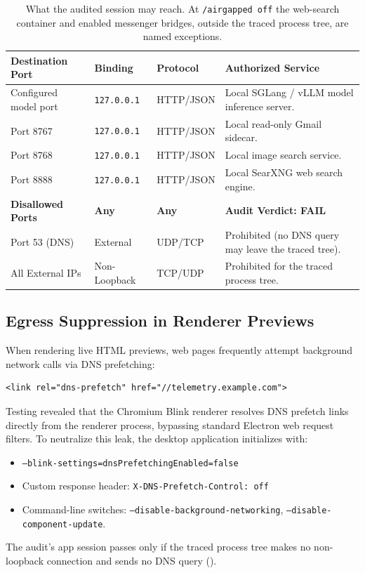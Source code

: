\documentclass[11pt]{article}
\newcommand{\code}[1]{\texttt{#1}}
\newcommand{\agoff}{\code{/airgapped off}}
\begin{document}
\begin{table}[t]
\centering
\small
\caption{What the audited session may reach. At \agoff{} the web-search container and enabled messenger bridges,
outside the traced process tree, are named exceptions.}
\label{tab:egress-verification}
\begin{tabularx}{\linewidth}{lllX}
\toprule
\textbf{Destination Port} & \textbf{Binding} & \textbf{Protocol} & \textbf{Authorized Service} \\
\midrule
Configured model port & \code{127.0.0.1} & HTTP/JSON & Local SGLang / vLLM model inference server. \\
Port 8767 & \code{127.0.0.1} & HTTP/JSON & Local read-only Gmail sidecar. \\
Port 8768 & \code{127.0.0.1} & HTTP/JSON & Local image search service. \\
Port 8888 & \code{127.0.0.1} & HTTP/JSON & Local SearXNG web search engine. \\
\midrule
\textbf{Disallowed Ports} & \textbf{Any} & \textbf{Any} & \textbf{Audit Verdict: FAIL} \\
Port 53 (DNS) & External & UDP/TCP & Prohibited (no DNS query may leave the traced tree). \\
All External IPs & Non-Loopback & TCP/UDP & Prohibited for the traced process tree. \\
\bottomrule
\end{tabularx}
\end{table}

\subsection{Egress Suppression in Renderer Previews}

When rendering live HTML previews, web pages frequently attempt background network calls via DNS prefetching:
\begin{lstlisting}
<link rel="dns-prefetch" href="//telemetry.example.com">
\end{lstlisting}
Testing revealed that the Chromium Blink renderer resolves DNS prefetch links directly from the renderer process,
bypassing standard Electron web request filters. To neutralize this leak, the desktop application initializes with:
\begin{itemize}
    \item \code{--blink-settings=dnsPrefetchingEnabled=false}
    \item Custom response header: \code{X-DNS-Prefetch-Control: off}
    \item Command-line switches: \code{--disable-background-networking}, \code{--disable-component-update}.
\end{itemize}
The audit's app session passes only if the traced process tree makes no non-loopback connection and sends no DNS
query ().
\end{document}
